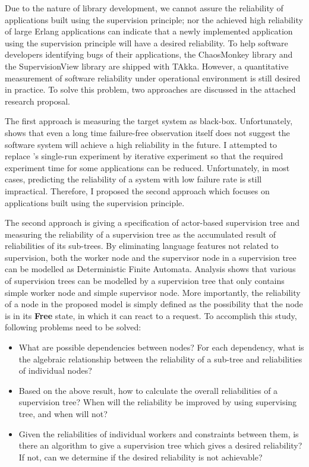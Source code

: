 \documentclass[11pt, a4paper, authoryear]{article}
\begin{document}
Due to the nature of library development, we cannot assure the reliability of 
applications built using the supervision principle; nor the achieved high 
reliability of large Erlang applications can indicate that a newly implemented 
application using the supervision principle will have a desired reliability.  
To help software developers identifying bugs of their applications, 
the ChaosMonkey library and the SupervisionView library are shipped with TAkka. 
 However, a quantitative measurement of software reliability under operational 
environment is still desired in practice.  To solve this problem, two 
approaches are discussed in the attached research proposal.

The first approach is measuring the target system as black-box.  Unfortunately, 
\citep{Littlewood93} shows that even a long time failure-free observation 
itself does not suggest the software system will achieve a high reliability in 
the future.  I attempted to replace \citep{Littlewood93}'s single-run experiment 
by 
iterative experiment so that the required experiment time for some applications 
can be reduced.  Unfortunately, in most cases, predicting the reliability of a 
system with low failure rate is still impractical.  Therefore, I proposed the 
second approach which focuses on applications built using the supervision 
principle.

The second approach is giving a specification of actor-based supervision tree 
and measuring the reliability of a supervision tree as the accumulated result 
of reliabilities of its sub-trees. 
By eliminating language features not related to supervision, both the worker 
node and the supervisor node in a supervision tree can be modelled as  
Deterministic Finite Automata.  Analysis shows that various of
supervision trees can be modelled by a supervision tree that only contains 
simple worker node and simple supervisor node.  More importantly, the 
reliability of a node in the proposed model is simply defined as the possibility 
that the node is in its {\bf Free} state, in which it can react to a request.  
To accomplish this study, following problems need to be solved:
\begin{itemize}
  \item What are possible dependencies between nodes? For each dependency,
what is the algebraic relationship between the reliability of a sub-tree
and reliabilities of individual nodes?
  \item Based on the above result, how to calculate the overall reliabilities
of a supervision tree? When will the reliability be improved by using
supervising tree, and when will not?
  \item Given the reliabilities of individual workers and constraints between
them, is there an algorithm to give a supervision tree which gives a desired 
reliability?  If not, can we determine if the desired reliability is not
achievable?
\end{itemize}
\end{document}
